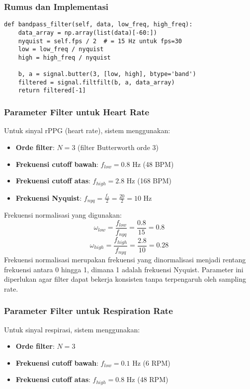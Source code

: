 \documentclass[11pt,a4paper]{article}
\begin{document}
\subsubsection{Rumus dan Implementasi}
    \begin{lstlisting}
def bandpass_filter(self, data, low_freq, high_freq):
    data_array = np.array(list(data)[-60:])
    nyquist = self.fps / 2  # = 15 Hz untuk fps=30
    low = low_freq / nyquist
    high = high_freq / nyquist
    
    b, a = signal.butter(3, [low, high], btype='band')
    filtered = signal.filtfilt(b, a, data_array)
    return filtered[-1]
    \end{lstlisting}

\subsubsection{Parameter Filter untuk Heart Rate}
Untuk sinyal rPPG (heart rate), sistem menggunakan:
\begin{itemize}
    \item \textbf{Orde filter}: $N = 3$ (filter Butterworth orde 3)
    \item \textbf{Frekuensi cutoff bawah}: $f_{low} = 0.8$ Hz (48 BPM)
    \item \textbf{Frekuensi cutoff atas}: $f_{high} = 2.8$ Hz (168 BPM)
    \item \textbf{Frekuensi Nyquist}: $f_{nyq} = \frac{f_s}{2} = \frac{20}{2} = 10$ Hz
\end{itemize}

Frekuensi normalisasi yang digunakan:
$$\omega_{low} = \frac{f_{low}}{f_{nyq}} = \frac{0.8}{15} = 0.8$$
$$\omega_{high} = \frac{f_{high}}{f_{nyq}} = \frac{2.8}{10} = 0.28$$
Frekuensi normalisasi merupakan frekuensi yang dinormalisasi menjadi rentang frekuensi antara  0 hingga 1, dimana 1 adalah frekuensi Nyquist. Parameter ini diperlukan agar filter dapat bekerja konsisten tanpa terpengaruh oleh sampling rate.

\subsubsection{Parameter Filter untuk Respiration Rate}
Untuk sinyal respirasi, sistem menggunakan:
\begin{itemize}
    \item \textbf{Orde filter}: $N = 3$
    \item \textbf{Frekuensi cutoff bawah}: $f_{low} = 0.1$ Hz (6 RPM)
    \item \textbf{Frekuensi cutoff atas}: $f_{high} = 0.8$ Hz (48 RPM)
\end{itemize}
\end{document}

